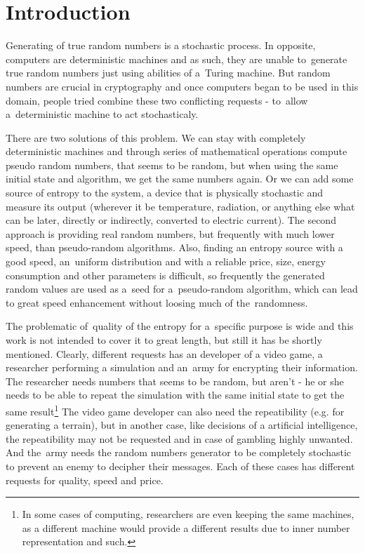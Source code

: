 \chapter{Introduction}
Generating of true random numbers is a stochastic process. In opposite, computers are deterministic machines and as such, they are unable to~generate true random numbers just using abilities of a~Turing machine.  %
But random numbers are crucial in cryptography and once computers began to be used in this domain,  %
people tried combine these two conflicting requests - to~allow a~deterministic machine to act stochasticaly. 

There are two solutions of this problem. We can stay with completely deterministic machines and through series of mathematical operations compute pseudo random numbers, that seems to be random, but when using the same initial state and algorithm, we get the same numbers again. Or we can add some source of entropy to the system, a device that is physically stochastic and measure its output (wherever it be temperature, radiation, or anything else what can be later, directly or indirectly, converted to electric current). The second approach is providing real random numbers, but frequently with much lower speed, than pseudo-random algorithms. Also, finding an entropy source with a good speed, an~uniform distribution and with a reliable price, size, energy consumption and other parameters is difficult, so frequently the generated random values are used as a~seed for a~pseudo-random algorithm, which can lead to great speed enhancement without loosing much of the~randomness.

The problematic of~quality of the entropy for a~specific purpose is wide and this work is not intended to cover it to great length, but still it has be shortly mentioned. Clearly, different requests has an developer of a video game, a researcher performing a simulation and an~army for encrypting their information. The researcher needs numbers that seems to be random, but aren't - he or she needs to be able to repeat the simulation with the same initial state to get the same result\footnote{In some cases of computing, researchers are even keeping the same machines, as a different machine would provide a different results due to inner number representation and such.\cite{ArithmeticInCloud}%
}
The video game developer can also need the repeatibility (e.g. for generating a terrain), but in another case, like decisions of a artificial intelligence, the repeatibility may not be requested and in case of gambling highly unwanted. And the~army needs the random numbers generator to be completely stochastic to prevent an enemy to decipher their messages. Each of these cases has different requests for quality, speed and price.


